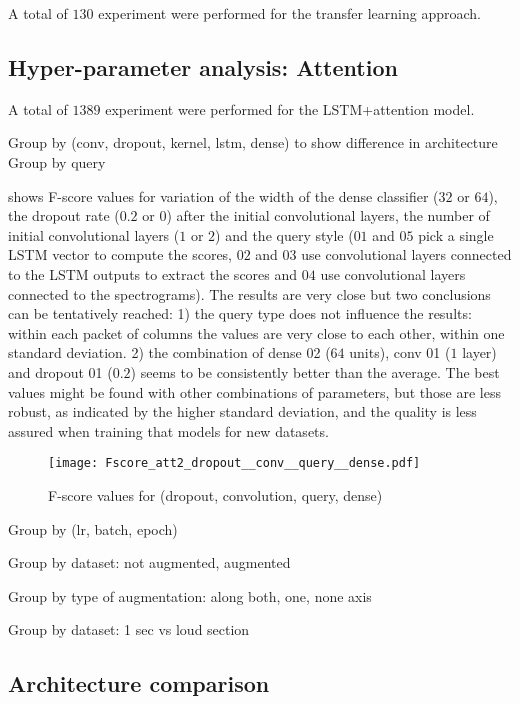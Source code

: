 A total of $130$ experiment were performed for the transfer learning approach.

\subsection{Hyper-parameter analysis: Attention}

A total of $1389$ experiment were performed for the LSTM+attention model.


Group by (conv, dropout, kernel, lstm, dense) to show difference in architecture
Group by query

 shows F-score values for 
variation of 
the width of the dense classifier ($32$ or $64$),
the dropout rate ($0.2$ or $0$) after the initial convolutional layers,
the number of initial convolutional layers ($1$ or $2$)
and
the query style ($01$ and $05$ pick a single LSTM vector to compute the scores,
$02$ and $03$ use convolutional layers connected to the LSTM outputs to extract
the scores and $04$  use convolutional layers connected to the spectrograms).
The results are very close but two conclusions can be tentatively reached:
1) the query type does not influence
the results: within each packet of columns the values are very close to each
other, within one standard deviation.
2) the combination of dense 02 ($64$ units), conv 01 ($1$ layer) and dropout 01 ($0.2$)
seems to be consistently better than the average.
The best values might be found with other combinations of parameters,
but those are less robust, as indicated by the higher standard deviation,
and the quality is less assured when training that models for new datasets.

\begin{figure*}[t!]
    \centering
    \texttt{[image: Fscore\_att2\_dropout\_\_conv\_\_query\_\_dense.pdf]}
    \caption{F-score values for (dropout, convolution, query, dense)}%
    \label{fig:dropout_conv_query_dense}
\end{figure*}

Group by (lr, batch, epoch)

Group by dataset: not augmented, augmented

Group by type of augmentation: along both, one, none axis

Group by dataset: 1 sec vs loud section

\subsection{Architecture comparison}

